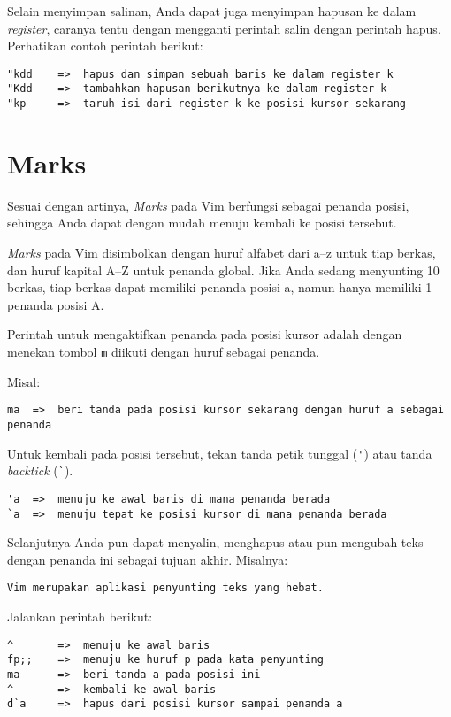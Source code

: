 \documentclass{article}
\begin{document}
Selain menyimpan salinan, Anda dapat juga menyimpan hapusan
ke dalam \emph{register}, caranya tentu dengan mengganti
perintah salin dengan perintah hapus. Perhatikan contoh
perintah berikut:

\begin{verbatim}
"kdd    =>  hapus dan simpan sebuah baris ke dalam register k
"Kdd    =>  tambahkan hapusan berikutnya ke dalam register k
"kp     =>  taruh isi dari register k ke posisi kursor sekarang
\end{verbatim}

\section{Marks}
Sesuai dengan artinya, \emph{Marks} pada Vim berfungsi
sebagai penanda posisi, sehingga Anda dapat dengan mudah
menuju kembali ke posisi tersebut.

\emph{Marks} pada Vim disimbolkan dengan huruf alfabet dari
a--z untuk tiap berkas, dan huruf kapital A--Z untuk penanda
global. Jika Anda sedang menyunting 10 berkas, tiap berkas
dapat memiliki penanda posisi a, namun hanya memiliki 1 penanda
posisi A.

Perintah untuk mengaktifkan penanda pada posisi kursor
adalah dengan menekan tombol \verb=m= diikuti dengan huruf
sebagai penanda.

Misal:

\begin{verbatim}
ma  =>  beri tanda pada posisi kursor sekarang dengan huruf a sebagai penanda
\end{verbatim}

Untuk kembali pada posisi tersebut, tekan tanda petik
tunggal (\verb='=) atau tanda \emph{backtick} (\verb=`=).

\begin{verbatim}
'a  =>  menuju ke awal baris di mana penanda berada
`a  =>  menuju tepat ke posisi kursor di mana penanda berada
\end{verbatim}

Selanjutnya Anda pun dapat menyalin, menghapus atau pun
mengubah teks dengan penanda ini sebagai tujuan akhir.
Misalnya:

\begin{verbatim}
Vim merupakan aplikasi penyunting teks yang hebat.
\end{verbatim}

Jalankan perintah berikut:

\begin{verbatim}
^       =>  menuju ke awal baris
fp;;    =>  menuju ke huruf p pada kata penyunting
ma      =>  beri tanda a pada posisi ini
^       =>  kembali ke awal baris
d`a     =>  hapus dari posisi kursor sampai penanda a
\end{verbatim}
\end{document}
